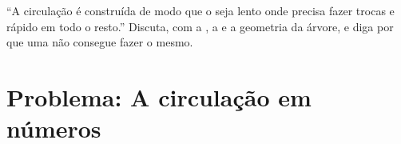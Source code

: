 \begin{exercise}[$\star\star\star$]\label{exo:b2:blood-circulation:12}
``A circulação é construída de modo que o  seja lento onde
precisa fazer trocas e rápido em todo o resto.'' Discuta, com a , a  e a geometria da árvore, e diga
por que uma  não consegue fazer o mesmo.
\end{exercise}

\section{Problema: A circulação em números}

